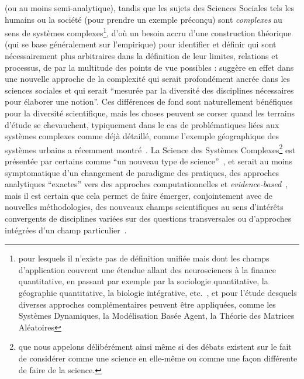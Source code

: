 {(ou au moins semi-analytique), tandis que les sujets des Sciences Sociales tels les humains ou la société (pour prendre un exemple préconçu) sont \emph{complexes} au sens de systèmes complexes\footnote{pour lesquels il n'existe pas de définition unifiée mais dont les champs d'application couvrent une étendue allant des neurosciences à la finance quantitative, en passant par exemple par la sociologie quantitative, la géographie quantitative, la biologie intégrative, etc.~\cite{newman2011complex}, et pour l'étude desquels diverses approches complémentaires peuvent être appliquées, comme les Systèmes Dynamiques, la Modélisation Basée Agent, la Théorie des Matrices Aléatoires}, d'où un besoin accru d'une construction théorique (qui se base généralement sur l'empirique) pour identifier et définir qui sont nécessairement plus arbitraires dans la définition de leur limites, relations et processus, de par la multitude des points de vue possibles :  suggère en effet dans~\cite{pumain2005cumulativite} une nouvelle approche de la complexité qui serait profondément ancrée dans les sciences sociales et qui serait ``mesurée par la diversité des disciplines nécessaires pour élaborer une notion''. Ces différences de fond sont naturellement bénéfiques pour la diversité scientifique, mais les choses peuvent se corser quand les terrains d'étude se chevauchent, typiquement dans le cas de problématiques liées aux systèmes complexes comme déjà détaillé, comme l'exemple géographique des systèmes urbains a récemment montré~\cite{dupuy2015sciences}. La Science des Systèmes Complexes\footnote{que nous appelons délibérément ainsi même si des débats existent sur le fait de considérer comme une science en elle-même ou comme une façon différente de faire de la science.} est présentée par certains comme ``un nouveau type de science''~\cite{wolfram2002new}, et serait au moins symptomatique d'un changement de paradigme des pratiques, des approches analytiques ``exactes'' vers des approches computationnelles et \emph{evidence-based}~\cite{arthur2015complexity}, mais il est certain que cela permet de faire émerger, conjointement avec de nouvelles méthodologies, des nouveaux champs scientifiques au sens d'intérêts convergents de disciplines variées sur des questions transversales ou d'approches intégrées d'un champ particulier~\cite{2009arXiv0907.2221B}.
}


